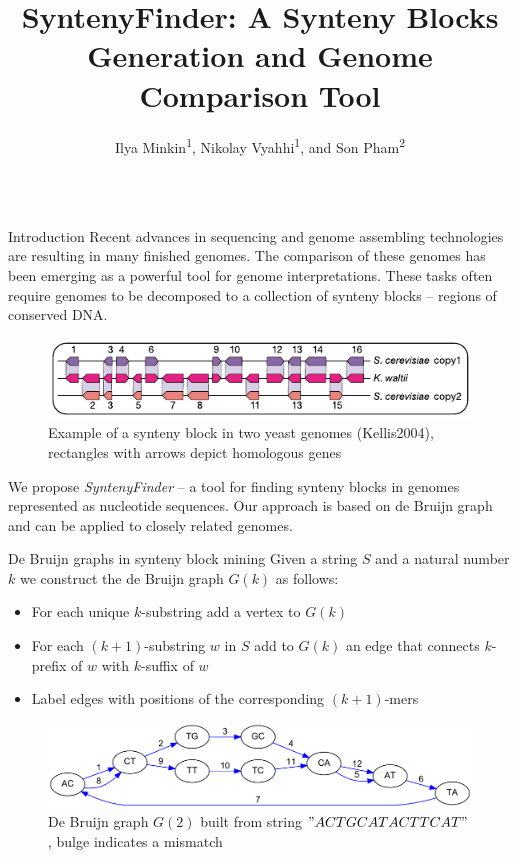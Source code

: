 \documentclass[final,hyperref={pdfpagelabels=false}]{beamer}
\title{SyntenyFinder: A Synteny Blocks Generation and Genome Comparison Tool}
\author{Ilya Minkin\textsuperscript{1}, Nikolay Vyahhi\textsuperscript{1}, and Son Pham\textsuperscript{2}}
\institute{\textsuperscript{1} St. Petersburg Academic University, St. Petersburg, Russia \\ \textsuperscript{2} University of California, San Diego, USA}
\begin{document}
\begin{frame}{}

\begin{columns}[t]

\begin{column}{0.32\linewidth}

\begin{block}{Introduction} \justifying
Recent advances in sequencing and genome assembling technologies are resulting in many finished genomes.
The comparison of these genomes has been emerging as a powerful tool for genome interpretations.
These tasks often require genomes to be  decomposed to a collection of synteny blocks -- regions of conserved DNA.
\begin{figure}
	\centering
	\includegraphics[scale = 2.8]{syntenyBlocks.pdf}
	\small \caption{Example of a synteny block in two yeast genomes (Kellis2004), rectangles with arrows depict homologous genes}
\end{figure}
We propose \textit{SyntenyFinder} -- a tool for finding synteny blocks in genomes represented as nucleotide sequences.
Our approach is based on de Bruijn graph and can be applied to closely related genomes.
\end{block}

\begin{block}{De Bruijn graphs in synteny block mining} \justifying
Given a string \(S\) and a natural number \(k\) we construct the de Bruijn graph \(G(k)\) as follows:

\begin{itemize}
\item For each unique \(k\)-substring add a vertex to \(G(k)\)
\item For each \((k + 1)\)-substring \(w\) in \(S\) add to \(G(k)\) an edge that connects \(k\)-prefix of \(w\) with \(k\)-suffix of \(w\)
\item Label edges with positions of the corresponding \((k + 1)\)-mers
\end{itemize}

\begin{figure}
	\centering
	\includegraphics[scale = 0.9]{simpleGraph.pdf}
	\small \caption{De Bruijn graph \(G(2)\) built from string \("ACTGCATACTTCAT"\), bulge indicates a mismatch}
\end{figure}             


\end{block}
\end{column}
\end{columns}
\end{frame}
\end{document}
